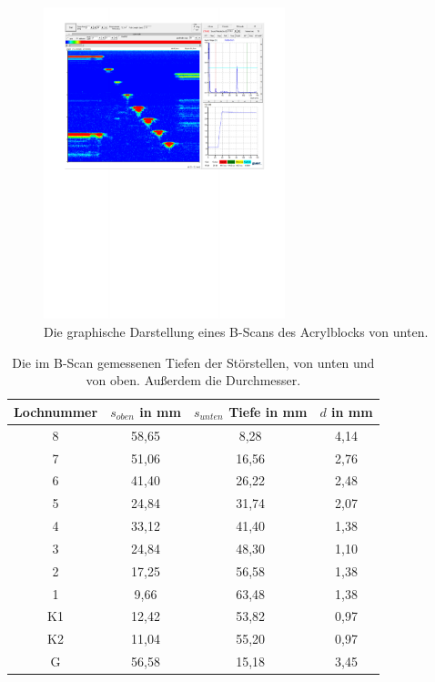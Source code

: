 \begin{figure}[H]
  \centering
  \includegraphics[width = 7cm]{content/bscan_unten.pdf}
  \caption{Die graphische Darstellung eines B-Scans des Acrylblocks von unten.}
  \label{fig:bunten}
\end{figure}


\begin{table}[H]
    \centering
    \caption{Die im B-Scan gemessenen Tiefen der Störstellen, von unten und von oben. Außerdem die Durchmesser.}
    \begin{tabular}{cccc}
      \toprule
      {Lochnummer} & 
      {$s_{oben}$ in mm} &
      {$s_{unten}$ Tiefe in mm} &
      {$d$ in mm} \\
      \midrule 
      8  &  58,65  &  8,28  &  4,14   \\
      7  &  51,06  & 16,56  &  2,76   \\
      6  &  41,40  & 26,22  &  2,48   \\
      5  &  24,84  & 31,74  &  2,07   \\
      4  &  33,12  & 41,40  &  1,38   \\
      3  &  24,84  & 48,30  &  1,10   \\
      2  &  17,25  & 56,58  &  1,38   \\
      1  &   9,66  & 63,48  &  1,38   \\
      K1 &  12,42  & 53,82  &  0,97   \\
      K2 &  11,04  & 55,20  &  0,97   \\   
      G  &  56,58  & 15,18  &  3,45   \\
      \bottomrule
    \end{tabular}
 \label{tab:bscan_tiefen}
\end{table}
\noindent


